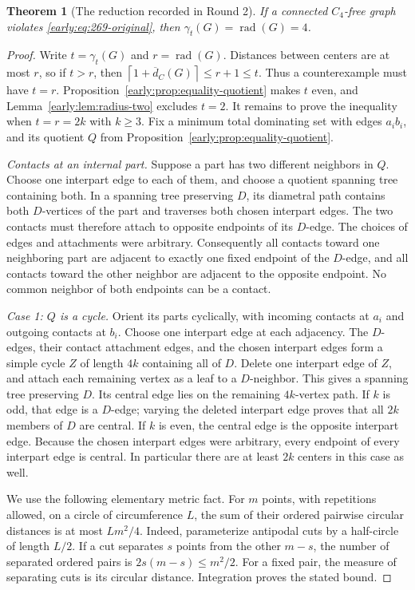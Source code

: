 \documentclass[11pt,a4paper]{article}
\newtheorem{theorem}{Theorem}[section]
\theoremstyle{definition}\newtheorem{definition}[theorem]{Definition}
\theoremstyle{remark}\newtheorem{remark}[theorem]{Remark}
\newcommand{\rad}{\operatorname{rad}}
\newcommand{\ceil}[1]{\left\lceil#1\right\rceil}
\begin{document}
\begin{theorem}[The reduction recorded in Round 2]
\label{early:thm:269-reduction}
If a connected $C_4$-free graph violates
\eqref{early:eq:269-original}, then
$\gamma_t(G)=\rad(G)=4$.
\end{theorem}
\begin{proof}
Write $t=\gamma_t(G)$ and $r=\rad(G)$.  Distances between centers
are at most $r$, so if $t>r$, then
$\ceil{1+\overline d_C(G)}\leq r+1\leq t$.  Thus a counterexample
must have $t=r$.  Proposition~\ref{early:prop:equality-quotient} makes
$t$ even, and Lemma~\ref{early:lem:radius-two} excludes $t=2$.
It remains to prove the inequality when $t=r=2k$ with $k\geq3$.
Fix a minimum total dominating set with edges $a_ib_i$, and its
quotient $Q$ from Proposition~\ref{early:prop:equality-quotient}.

\emph{Contacts at an internal part.}
Suppose a part has two different neighbors in $Q$.  Choose one
interpart edge to each of them, and choose a quotient spanning tree
containing both.  In a spanning tree preserving $D$, its diametral
path contains both $D$-vertices of the part and traverses both chosen
interpart edges.  The two contacts must therefore attach to opposite
endpoints of its $D$-edge.  The choices of edges and attachments were
arbitrary.  Consequently all contacts toward one neighboring part
are adjacent to exactly one fixed endpoint of the $D$-edge, and all
contacts toward the other neighbor are adjacent to the opposite
endpoint.  No common neighbor of both endpoints can be a contact.

\emph{Case 1: $Q$ is a cycle.}
Orient its parts cyclically, with incoming contacts at $a_i$ and
outgoing contacts at $b_i$.  Choose one interpart edge at each
adjacency.  The $D$-edges, their contact attachment edges, and the
chosen interpart edges form a simple cycle $Z$ of length $4k$
containing all of $D$.  Delete one interpart edge of $Z$, and attach
each remaining vertex as a leaf to a $D$-neighbor.  This gives a
spanning tree preserving $D$.  Its central edge lies on the remaining
$4k$-vertex path.  If $k$ is odd, that edge is a $D$-edge; varying
the deleted interpart edge proves that all $2k$ members of $D$ are
central.  If $k$ is even, the central edge is the opposite interpart
edge.  Because the chosen interpart edges were arbitrary, every
endpoint of every interpart edge is central.  In particular there
are at least $2k$ centers in this case as well.

We use the following elementary metric fact.  For $m$ points, with
repetitions allowed, on a circle of circumference $L$, the sum of
their ordered pairwise circular distances is at most $Lm^2/4$.
Indeed, parameterize antipodal cuts by a half-circle of length $L/2$.
If a cut separates $s$ points from the other $m-s$, the number of
separated ordered pairs is $2s(m-s)\leq m^2/2$.  For a fixed pair,
the measure of separating cuts is its circular distance.  Integration
proves the stated bound.


\end{proof}
\end{document}
